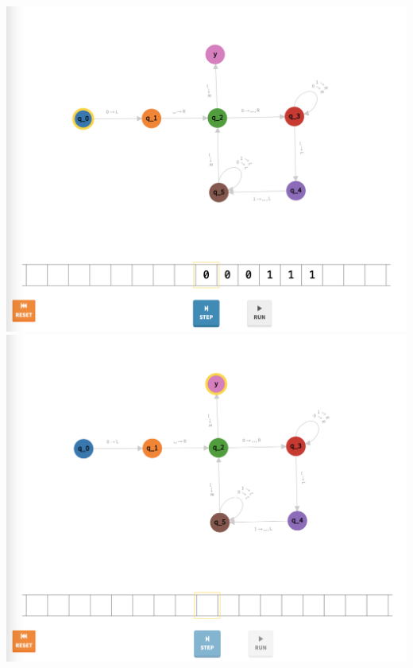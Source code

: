 \documentclass[a4paper]{article}
\begin{document}
\begin{center}
\includegraphics[width=\textwidth]{TM1.3}
\includegraphics[width=\textwidth]{TM1.4}
\end{center}
\newpage
\end{document}
